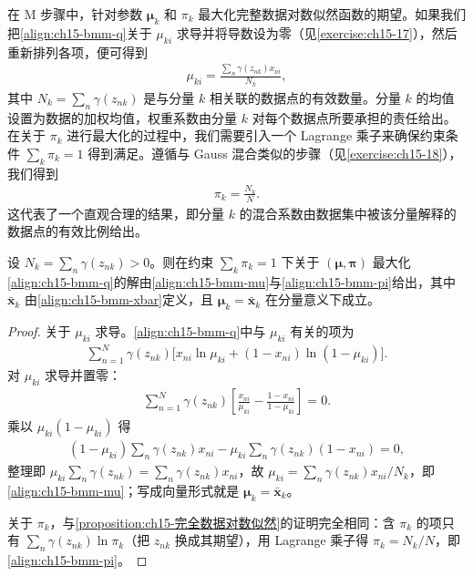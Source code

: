 \documentclass[../../main.tex]{subfiles}
\begin{document}
在 M 步骤中，针对参数 $\bm{\mu}_k$ 和 $\pi_k$ 最大化完整数据对数似然函数的期望。如果我们把\eqref{align:ch15-bmm-q}关于 $\mu_{ki}$ 求导并将导数设为零（见\cref{exercise:ch15-17}），然后重新排列各项，便可得到
\begin{align}
\mu_{ki}=\frac{\sum_n\gamma(z_{nk})x_{ni}}{N_k},
\label{align:ch15-bmm-mu}
\end{align}
其中 $N_k=\sum_n\gamma(z_{nk})$ 是与分量 $k$ 相关联的数据点的有效数量。分量 $k$ 的均值设置为数据的加权均值，权重系数由分量 $k$ 对每个数据点所要承担的责任给出。在关于 $\pi_k$ 进行最大化的过程中，我们需要引入一个 Lagrange 乘子来确保约束条件 $\sum_k\pi_k=1$ 得到满足。遵循与 Gauss 混合类似的步骤（见\cref{exercise:ch15-18}），我们得到
\begin{align}
\pi_k=\frac{N_k}{N}.
\label{align:ch15-bmm-pi}
\end{align}
这代表了一个直观合理的结果，即分量 $k$ 的混合系数由数据集中被该分量解释的数据点的有效比例给出。

\begin{proposition}\label{proposition:ch15-Bernoulli混合EM}
设 $N_k=\sum_n\gamma(z_{nk})>0$。则在约束 $\sum_k\pi_k=1$ 下关于 $(\bm{\mu},\bm{\pi})$ 最大化\eqref{align:ch15-bmm-q}的解由\eqref{align:ch15-bmm-mu}与\eqref{align:ch15-bmm-pi}给出，其中 $\bar{\bm{x}}_k$ 由\eqref{align:ch15-bmm-xbar}定义，且 $\bm{\mu}_k=\bar{\bm{x}}_k$ 在分量意义下成立。
\end{proposition}
\begin{proof}
关于 $\mu_{ki}$ 求导。\eqref{align:ch15-bmm-q}中与 $\mu_{ki}$ 有关的项为
\begin{align*}
\sum_{n=1}^{N}\gamma(z_{nk})\big[x_{ni}\ln\mu_{ki}+(1-x_{ni})\ln(1-\mu_{ki})\big].
\end{align*}
对 $\mu_{ki}$ 求导并置零：
\begin{align*}
\sum_{n=1}^{N}\gamma(z_{nk})\left[\frac{x_{ni}}{\mu_{ki}}-\frac{1-x_{ni}}{1-\mu_{ki}}\right]=0.
\end{align*}
乘以 $\mu_{ki}(1-\mu_{ki})$ 得
\begin{align*}
(1-\mu_{ki})\sum_{n}\gamma(z_{nk})x_{ni}-\mu_{ki}\sum_{n}\gamma(z_{nk})(1-x_{ni})=0,
\end{align*}
整理即 $\mu_{ki}\sum_n\gamma(z_{nk})=\sum_n\gamma(z_{nk})x_{ni}$，故 $\mu_{ki}=\sum_n\gamma(z_{nk})x_{ni}/N_k$，即\eqref{align:ch15-bmm-mu}；写成向量形式就是 $\bm{\mu}_k=\bar{\bm{x}}_k$。

关于 $\pi_k$，与\cref{proposition:ch15-完全数据对数似然}的证明完全相同：含 $\pi_k$ 的项只有 $\sum_n\gamma(z_{nk})\ln\pi_k$（把 $z_{nk}$ 换成其期望），用 Lagrange 乘子得 $\pi_k=N_k/N$，即\eqref{align:ch15-bmm-pi}。
\end{proof}
\end{document}
